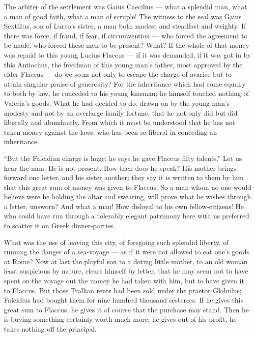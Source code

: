  The arbiter of the settlement was Gaius Caecilius --- what a splendid man, what a man of good faith, what a man of scruple! The witness to the seal was Gaius Sextilius, son of Lurco's sister, a man both modest and steadfast and weighty. If there was force, if fraud, if fear, if circumvention --- who forced the agreement to be made, who forced these men to be present? What? If the whole of that money was repaid to this young Lucius Flaccus --- if it was demanded, if it was got in by this Antiochus, the freedman of this young man's father, most approved by the elder Flaccus --- do we seem not only to escape the charge of avarice but to attain singular praise of generosity? For the inheritance which had come equally to both by law, he conceded to his young kinsman; he himself touched nothing of Valeria's goods. What he had decided to do, drawn on by the young man's modesty and not by an overlarge family fortune, that he not only did but did liberally and abundantly. From which it must be understood that he has not taken money against the laws, who has been so liberal in conceding an inheritance.

 ``But the Falcidian charge is huge: he says he gave Flaccus fifty talents.'' Let us hear the man. He is not present. How then does he speak? His mother brings forward one letter, and his sister another; they say it is written to them by him that this great sum of money was given to Flaccus. So a man whom no one would believe were he holding the altar and swearing, will prove what he wishes through a letter, unsworn? And what a man! How disloyal to his own fellow-citizens! He who could have run through a tolerably elegant patrimony here with us preferred to scatter it on Greek dinner-parties.

 What was the use of leaving this city, of foregoing such splendid liberty, of running the danger of a sea-voyage --- as if it were not allowed to eat one's goods at Rome? Now at last the playful son to a doting little mother, to an old woman least suspicious by nature, clears himself by letter, that he may seem not to have spent on the voyage out the money he had taken with him, but to have given it to Flaccus. But those Trallian rents had been sold under the praetor Globulus; Falcidius had bought them for nine hundred thousand sesterces. If he gives this great sum to Flaccus, he gives it of course that the purchase may stand. Then he is buying something certainly worth much more; he gives out of his profit, he takes nothing off the principal.

